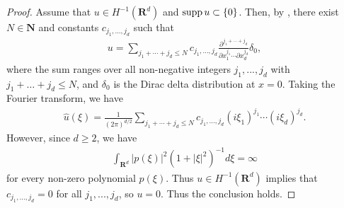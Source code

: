 \documentclass[12pt,a4paper]{article}
\def\supp{\mathop{\rm supp}\nolimits}
\begin{document}
\begin{proof}
Assume that $u\in H^{-1}(\mathbf{R}^d)$ and $\supp u\subset \{0\}$.
Then, by \cite[Theorem 6.25]{Ru},
there exist $N\in \mathbf{N}$ and constants $c_{j_1,...,j_d}$ such that
\begin{align*}
 u=
\sum_{j_1+\cdots+j_d\leq N}c_{j_1,...,j_d}
\frac{\partial^{j_1+\cdots+j_d}}{\partial x_1^{j_1}\cdots \partial x_d^{j_d}}\delta_0,
\end{align*}
where 
the sum ranges over all non-negative integers 
$j_1,...,j_d$ with $j_1+\ldots +j_d\leq N$,
and $\delta_0$ is the Dirac delta distribution at $x=0$.
Taking the Fourier transform, we have
\begin{align*}
\hat{u}(\xi)
=
\frac{1}{(2\pi)^{d/2}}
\sum_{j_1+\cdots+j_d\leq N}c_{j_1,...,j_d}
(i \xi_1)^{j_1}\cdots (i\xi_d)^{j_d}.
\end{align*}
However, since $d\geq 2$, we have
\begin{align*}
 \int_{\mathbf{R}^d}|p(\xi)|^2(1+|\xi|^2)^{-1}d\xi=\infty
\end{align*}
for every non-zero polynomial $p(\xi)$.
Thus $u\in H^{-1}(\mathbf{R}^d)$ implies that $c_{j_1,...,j_d}=0$ for all
$j_1,...,j_d$, so $u=0$.
Thus the conclusion holds.
%
%
%

\end{proof}
\end{document}
